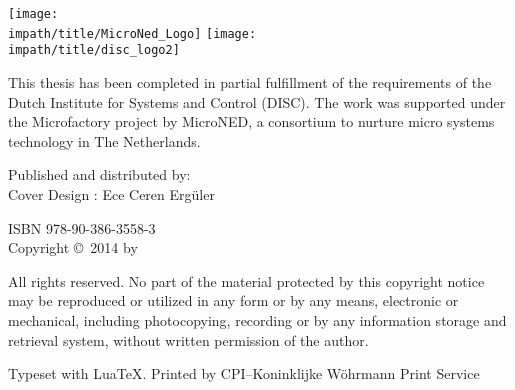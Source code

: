 \vspace{20mm}
\begin{center}
    \Large\ilhana
\end{center}
\newpage
\thispagestyle{empty}
\smallskip\noindent
{
\flushleft\texttt{[image: \\impath/title/MicroNed\_Logo]}\hspace*{0.75cm}
\vspace{1em}
\texttt{[image: \\impath/title/disc\_logo2]}
\vspace{1em}


\parbox{\textwidth}{\noindent This thesis has been completed in partial fulfillment of
the requirements of the Dutch Institute for Systems and Control
(DISC). The work was supported under the Microfactory project by
MicroNED, a consortium to nurture micro systems technology in
The Netherlands.
}
\vfill

Published and distributed by: \ilhana\\
Cover Design : Ece Ceren Erg\"{u}ler

\bigskip{}
ISBN \textsf{978-90-386-3558-3}\\
Copyright \copyright~2014 by \ilhana
}


\bigskip{}
\noindent All rights reserved. No part of the material protected by
this copyright notice may be reproduced or utilized in any form or
by any means, electronic or mechanical, including photocopying,
recording or by any information storage and retrieval system,
without written permission of the author.

\bigskip{}
\noindent Typeset with Lua\kern-0.9bp\TeX. Printed by CPI–Koninklijke Wöhrmann Print Service
